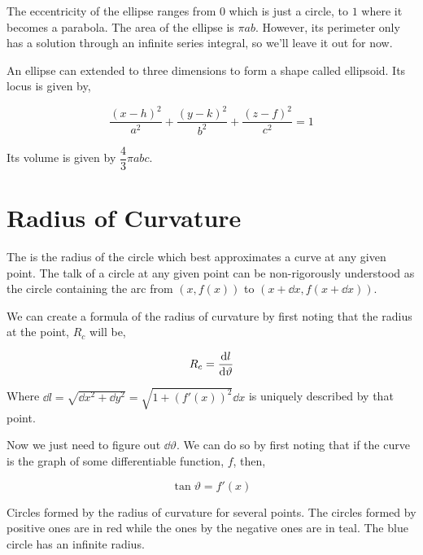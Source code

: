 The eccentricity of the ellipse ranges from \(0\) which is just a circle, to \(1\) where 
it becomes a parabola. The area of the ellipse is \(\pi ab\). However, its 
perimeter only has a solution through an infinite series integral, so we'll leave it 
out for now.

An ellipse can extended to three dimensions to form a shape called ellipsoid. Its locus is given by,

\begin{equation}
    \frac{(x-h)^2}{a^2} + \frac{(y-k)^2}{b^2} + \frac{(z-f)^2}{c^2} = 1
\end{equation}

Its volume is given by \(\dfrac{4}{3}\pi abc\).

\section{Radius of Curvature}

The  is the radius of the circle which best approximates 
a curve at any given point. The talk of a circle at any given point can be non-rigorously 
understood as the circle containing the arc from \((x, f(x))\) to \((x + \dd{x}, f(x + \dd{x}))\). 

We can create a formula of the radius of curvature by first noting that the 
radius at the point, \(R_c\) will be, 

\begin{equation*}
    R_c = \dv{l}{\vartheta}
\end{equation*}

Where \(\dd{l} = \sqrt{\dd{x}^2 + \dd{y}^2} = \sqrt{1 + (f'(x))^2} \dd{x}\) is uniquely described by that point. 

Now we just need to figure out \(\dd{\vartheta}\). We can do so by first noting that 
if the curve is the graph of some differentiable function, \(f\), then,

\begin{equation*}
    \tan \vartheta = f'(x)
\end{equation*}

\begin{marginfigure}
    \caption{Circles formed by the radius of curvature for several points. The circles
    formed by positive ones are in red while the ones by the negative ones are in teal. 
    The blue circle has an infinite radius.}
    \label{fig: roc}
\end{marginfigure}

